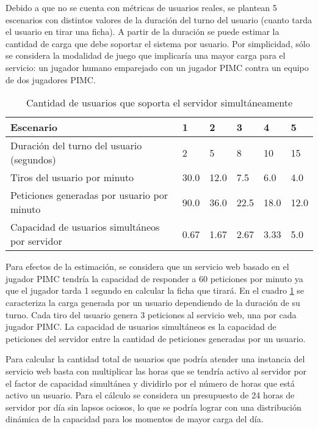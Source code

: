 Debido a que no se cuenta con métricas de usuarios reales, se plantean 5
escenarios con distintos valores de la duración del turno del usuario (cuanto
tarda el usuario en tirar una ficha). A partir de la duración se puede estimar
la cantidad de carga que debe soportar el sistema por usuario. Por simplicidad,
sólo se considera la modalidad de juego que implicaría una mayor carga para el
servicio: un jugador humano emparejado con un jugador PIMC contra un equipo de
dos jugadores PIMC.

\begin{table}[!ht]
    \centering
    \caption{
        Cantidad de usuarios que soporta el servidor simultáneamente
        }
    \small
    \begin{tabular}{|l|l|l|l|l|l|}
    \hline
        Escenario &  1 &  2 & 3 & 4 & 5 \\ \hline
        Duración del turno del usuario (segundos) & 2 & 5 & 8 & 10 & 15 \\ \hline
        Tiros del usuario por minuto & 30.0 & 12.0 & 7.5 & 6.0 & 4.0 \\ \hline
        Peticiones generadas por usuario por minuto & 90.0 & 36.0 & 22.5 & 18.0 & 12.0 \\ \hline
        Capacidad de usuarios simultáneos por servidor & 0.67 & 1.67 & 2.67 & 3.33 & 5.0 \\ \hline
    \end{tabular}
    \label{CPC}
\end{table}

Para efectos de la estimación, se considera que un servicio web basado en el
jugador PIMC tendría la capacidad de responder a 60 peticiones por minuto ya que
el jugador tarda 1 segundo en calcular la ficha que tirará. En el cuadro
\ref{CPC} se caracteriza la carga generada por un usuario dependiendo de la
duración de su turno. Cada tiro del usuario genera 3 peticiones al servicio web,
una por cada jugador PIMC. La capacidad de usuarios simultáneos es la capacidad
de peticiones del servidor entre la cantidad de peticiones generadas por un
usuario.

Para calcular la cantidad total de usuarios que podría atender una instancia del
servicio web basta con multiplicar las horas que se tendría activo al servidor
por el factor de capacidad simultánea y dividirlo por el número de horas que
está activo un usuario. Para el cálculo se considera un presupuesto de 24 horas
de servidor por día sin lapsos ociosos, lo que se podría lograr con una
distribución dinámica de la capacidad para los momentos de mayor carga del día.

